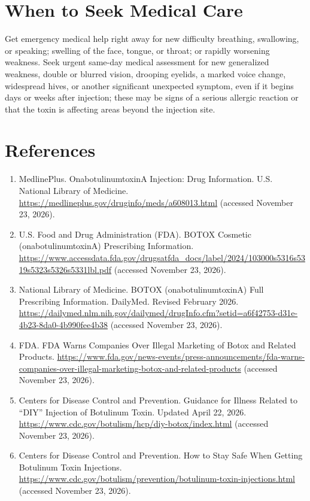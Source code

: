 \section*{When to Seek Medical Care}
Get emergency medical help right away for new difficulty breathing, swallowing, or speaking; swelling of the face, tongue, or throat; or rapidly worsening weakness. Seek urgent same-day medical assessment for new generalized weakness, double or blurred vision, drooping eyelids, a marked voice change, widespread hives, or another significant unexpected symptom, even if it begins days or weeks after injection; these may be signs of a serious allergic reaction or that the toxin is affecting areas beyond the injection site.

\section*{References}
\begin{enumerate}
  \item MedlinePlus. OnabotulinumtoxinA Injection: Drug Information. U.S. National Library of Medicine. \url{https://medlineplus.gov/druginfo/meds/a608013.html} (accessed November 23, 2026).
  \item U.S. Food and Drug Administration (FDA). BOTOX Cosmetic (onabotulinumtoxinA) Prescribing Information. \url{https://www.accessdata.fda.gov/drugsatfda_docs/label/2024/103000s5316s5319s5323s5326s5331lbl.pdf} (accessed November 23, 2026).
  \item National Library of Medicine. BOTOX (onabotulinumtoxinA) Full Prescribing Information. DailyMed. Revised February 2026. \url{https://dailymed.nlm.nih.gov/dailymed/drugInfo.cfm?setid=a6f42753-d31e-4b23-8da0-4b990fee4b38} (accessed November 23, 2026).
  \item FDA. FDA Warns Companies Over Illegal Marketing of Botox and Related Products. \url{https://www.fda.gov/news-events/press-announcements/fda-warns-companies-over-illegal-marketing-botox-and-related-products} (accessed November 23, 2026).
  \item Centers for Disease Control and Prevention. Guidance for Illness Related to \textquotedblleft DIY\textquotedblright{} Injection of Botulinum Toxin. Updated April 22, 2026. \url{https://www.cdc.gov/botulism/hcp/diy-botox/index.html} (accessed November 23, 2026).
  \item Centers for Disease Control and Prevention. How to Stay Safe When Getting Botulinum Toxin Injections. \url{https://www.cdc.gov/botulism/prevention/botulinum-toxin-injections.html} (accessed November 23, 2026).
\end{enumerate}

\clearpage
